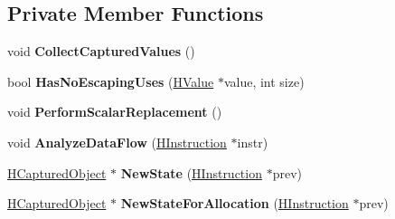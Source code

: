 \subsection*{Private Member Functions}
\begin{DoxyCompactItemize}
\item 
void {\bfseries Collect\+Captured\+Values} ()\hypertarget{classv8_1_1internal_1_1_h_escape_analysis_phase_aead71b755a4e2571726d9b532fa1fedf}{}\label{classv8_1_1internal_1_1_h_escape_analysis_phase_aead71b755a4e2571726d9b532fa1fedf}

\item 
bool {\bfseries Has\+No\+Escaping\+Uses} (\hyperlink{classv8_1_1internal_1_1_h_value}{H\+Value} $\ast$value, int size)\hypertarget{classv8_1_1internal_1_1_h_escape_analysis_phase_a24adbaa27fd8b1740a30098949d820cd}{}\label{classv8_1_1internal_1_1_h_escape_analysis_phase_a24adbaa27fd8b1740a30098949d820cd}

\item 
void {\bfseries Perform\+Scalar\+Replacement} ()\hypertarget{classv8_1_1internal_1_1_h_escape_analysis_phase_a4dfd734ada1cce33de03a831d4cd906d}{}\label{classv8_1_1internal_1_1_h_escape_analysis_phase_a4dfd734ada1cce33de03a831d4cd906d}

\item 
void {\bfseries Analyze\+Data\+Flow} (\hyperlink{classv8_1_1internal_1_1_h_instruction}{H\+Instruction} $\ast$instr)\hypertarget{classv8_1_1internal_1_1_h_escape_analysis_phase_a16b674fd0e1aed2155370be62819efec}{}\label{classv8_1_1internal_1_1_h_escape_analysis_phase_a16b674fd0e1aed2155370be62819efec}

\item 
\hyperlink{classv8_1_1internal_1_1_h_captured_object}{H\+Captured\+Object} $\ast$ {\bfseries New\+State} (\hyperlink{classv8_1_1internal_1_1_h_instruction}{H\+Instruction} $\ast$prev)\hypertarget{classv8_1_1internal_1_1_h_escape_analysis_phase_a38056feecc89db2d3f531ca2098acf61}{}\label{classv8_1_1internal_1_1_h_escape_analysis_phase_a38056feecc89db2d3f531ca2098acf61}

\item 
\hyperlink{classv8_1_1internal_1_1_h_captured_object}{H\+Captured\+Object} $\ast$ {\bfseries New\+State\+For\+Allocation} (\hyperlink{classv8_1_1internal_1_1_h_instruction}{H\+Instruction} $\ast$prev)\hypertarget{classv8_1_1internal_1_1_h_escape_analysis_phase_a06d654b218b17d39ea5c6bb7e1613426}{}\label{classv8_1_1internal_1_1_h_escape_analysis_phase_a06d654b218b17d39ea5c6bb7e1613426}


\end{DoxyCompactItemize}
